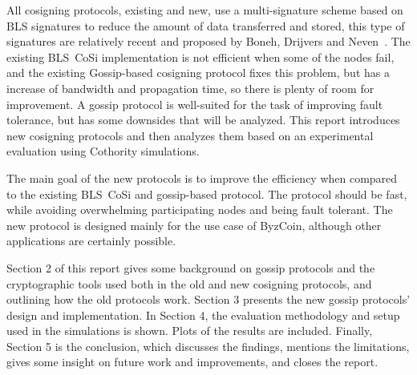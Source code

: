 All cosigning protocols, existing and new, use a multi-signature scheme based on BLS signatures to reduce the amount of data transferred and stored, this type of signatures are relatively recent and proposed by Boneh, Drijvers and Neven~\cite{Boneh18}.
The existing BLS~CoSi implementation is not efficient when some of the nodes fail, and the existing Gossip-based cosigning protocol fixes this problem, but has a increase of bandwidth and propagation time, so there is plenty of room for improvement. A gossip protocol is well-suited for the task of improving fault tolerance, but has some downsides that will be analyzed.
This report introduces new cosigning protocols and then analyzes them based on an experimental evaluation using Cothority simulations.

The main goal of the new protocols is to improve the efficiency when compared to the existing BLS~CoSi and gossip-based protocol. The protocol should be fast, while avoiding overwhelming participating nodes and being fault tolerant.
The new protocol is designed mainly for the use case of \mbox{ByzCoin}, although other applications are certainly possible.

Section 2 of this report gives some background on gossip protocols and the cryptographic tools used both in the old and new cosigning protocols, and outlining how the old protocols work.
Section 3 presents the new gossip protocols' design and implementation.
In Section 4, the evaluation methodology and setup used in the simulations is shown. Plots of the results are included.
Finally, Section 5 is the conclusion, which discusses the findings, mentions the limitations, gives some insight on future work and improvements, and closes the report.


